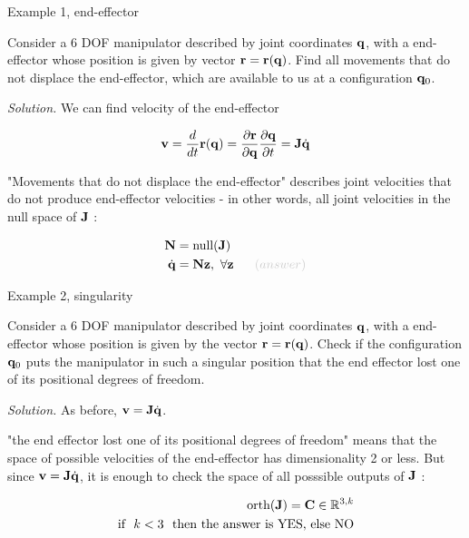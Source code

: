 \documentclass{beamer}
\begin{document}
\begin{frame}{Example 1, end-effector}
	\begin{flushleft}
		
		Consider a 6 DOF manipulator described by joint coordinates $\mathbf{q}$,  with a end-effector whose position is given by vector $\mathbf{r} = \mathbf{r}(\mathbf{q})$. Find all movements that do not displace the end-effector, which are available to us at a configuration $\mathbf{q}_0$.
		
		\bigskip
		
		\emph{Solution.} We can find velocity of the end-effector 
		
		\begin{equation}
			\mathbf{v} = \frac{d}{dt} \mathbf{r}(\mathbf{q}) = \frac{\partial \mathbf{r}}{\partial \mathbf{q}} \frac{\partial \mathbf{q}}{\partial t} = \mathbf{J} \dot{\mathbf{q}}
		\end{equation}
		
		"Movements that do not displace the end-effector" describes joint velocities that do not produce end-effector velocities - in other words, all joint velocities in the null space of $\mathbf{J}$ :
		
		\begin{align}
			\bo{N} &= \text{null} ( \bo{J} )
			\\
			 \dot{\bo{q}} &= \bo{N} \bo{z}, \ \forall \bo{z} \ \ \ \ \ \textcolor{mygray}{(answer)}
		\end{align}
		
		
		
	\end{flushleft}
\end{frame}



\begin{frame}{Example 2, singularity}
	\begin{flushleft}
		
		Consider a 6 DOF manipulator described by joint coordinates $\mathbf{q}$,  with a end-effector whose position is given by the vector $\mathbf{r} = \mathbf{r}(\mathbf{q})$. Check if the configuration $\mathbf{q}_0$ puts the manipulator in such a singular position that the end effector lost one of its positional degrees of freedom.
		
		\bigskip
		
		\emph{Solution.} As before, $\mathbf{v} = \mathbf{J} \dot{\mathbf{q}}$.
		
		"the end effector lost one of its positional degrees of freedom" means that the space of possible velocities of the end-effector has dimensionality 2 or less. But since $\mathbf{v} = \mathbf{J} \dot{\mathbf{q}}$, it is enough to check the space of all posssible outputs of $\mathbf{J}$ :
		
		\begin{align}
			 \text{orth} ( \mathbf{J} ) = 	\mathbf{C} \in \mathbb{R}^{3, k}
			\\
			\text{if} \ \ k < 3 \ \ \text{then the answer is YES, else NO}
		\end{align}
		
		
		
	\end{flushleft}
\end{frame}
\end{document}
